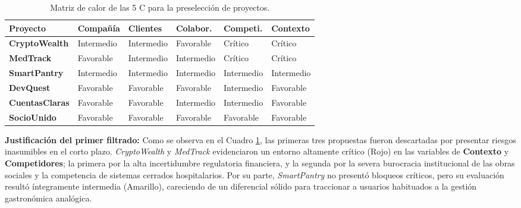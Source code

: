 \begin{table}[h!]
\centering
\renewcommand{\arraystretch}{1.5}
\begin{tabularx}{\textwidth}{|l|X|X|X|X|X|}
\hline
\rowcolor{gray!20} \textbf{Proyecto} & \textbf{Compañía} & \textbf{Clientes} & \textbf{Colabor.} & \textbf{Competi.} & \textbf{Contexto} \\ \hline
\textbf{CryptoWealth} & \cellcolor{yellow!50}Intermedio & \cellcolor{yellow!50}Intermedio & \cellcolor{green!50}Favorable & \cellcolor{red!50}Crítico & \cellcolor{red!50}Crítico \\ \hline
\textbf{MedTrack} & \cellcolor{green!50}Favorable & \cellcolor{yellow!50}Intermedio & \cellcolor{yellow!50}Intermedio & \cellcolor{red!50}Crítico & \cellcolor{red!50}Crítico \\ \hline
\textbf{SmartPantry} & \cellcolor{yellow!50}Intermedio & \cellcolor{yellow!50}Intermedio & \cellcolor{yellow!50}Intermedio & \cellcolor{yellow!50}Intermedio & \cellcolor{yellow!50}Intermedio \\ \hline
\textbf{DevQuest} & \cellcolor{green!50}Favorable & \cellcolor{green!50}Favorable & \cellcolor{green!50}Favorable & \cellcolor{yellow!50}Intermedio & \cellcolor{green!50}Favorable \\ \hline
\textbf{CuentasClaras} & \cellcolor{green!50}Favorable & \cellcolor{green!50}Favorable & \cellcolor{yellow!50}Intermedio & \cellcolor{yellow!50}Intermedio & \cellcolor{green!50}Favorable \\ \hline
\textbf{SocioUnido} & \cellcolor{green!50}Favorable & \cellcolor{green!50}Favorable & \cellcolor{green!50}Favorable & \cellcolor{green!50}Favorable & \cellcolor{green!50}Favorable \\ \hline
\end{tabularx}
\caption{Matriz de calor de las 5 C para la preselección de proyectos.}
\label{tab:semaforo_5c}
\end{table}

\newpage

\textbf{Justificación del primer filtrado:}
Como se observa en el Cuadro \ref{tab:semaforo_5c}, las primeras tres propuestas fueron descartadas por presentar riesgos inasumibles en el corto plazo. \textit{CryptoWealth} y \textit{MedTrack} evidenciaron un entorno altamente crítico (\colorbox{red!50}{Rojo}) en las variables de \textbf{Contexto} y \textbf{Competidores}; la primera por la alta incertidumbre regulatoria financiera, y la segunda por la severa burocracia institucional de las obras sociales y la competencia de sistemas cerrados hospitalarios. Por su parte, \textit{SmartPantry} no presentó bloqueos críticos, pero su evaluación resultó íntegramente intermedia (\colorbox{yellow!50}{Amarillo}), careciendo de un diferencial sólido para traccionar a usuarios habituados a la gestión gastronómica analógica.

